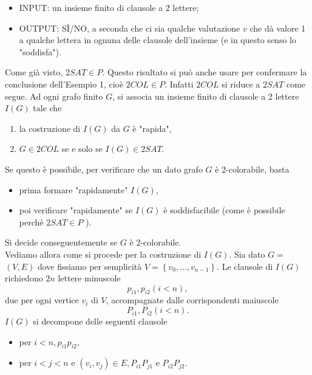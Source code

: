 \begin{enumerate}
          \begin{itemize}
              \item INPUT: un insieme finito di clausole a 2 lettere;
              \item OUTPUT: Sİ/NO, a seconda che ci sia qualche valutazione $v$
                    che dà valore 1 a qualche lettera in ognuna delle clausole
                    dell'insieme (e in questo senso lo "soddisfa").
          \end{itemize}

          Come già visto, $2 S A T \in P$. Questo risultato si può anche usare
          per confermare la conclusione dell'Esempio 1, cioè $2 C O L \in P$.
          Infatti $2 C O L$ si riduce a $2 S A T$ come segue. Ad ogni grafo
          finito $G$, si associa un insieme finito di clausole a 2 lettere
          $I(G)$ tale che

          \begin{enumerate}[label=(\roman*)]
              \item la costruzione di $I(G)$ da $G$ è "rapida",
              \item $G \in 2 C O L$ se e solo se $I(G) \in 2 S A T$.
          \end{enumerate}

          Se questo è possibile, per verificare che un dato grafo $G$ è
          2-colorabile, basta
          \begin{itemize}
              \item prima formare "rapidamente" $I(G)$,
              \item poi verificare "rapidamente" se $I(G)$ è soddisfacibile
                    (come è possibile perché $2 S A T \in P$ ).
          \end{itemize}

          Si decide conseguentemente se $G$ è 2-colorabile.\\
          Vediamo allora come
          si procede per la costruzione di $I(G)$. Sia dato $G=$ $(V, E)$ dove
          fissiamo per semplicità $V=\left\{v_0, \ldots, v_{n-1}\right\}$. Le
          clausole di $I(G)$ richiedono $2 n$ lettere minuscole
          $$
              p_{i 1}, p_{i 2}(i<n),
          $$
          due per ogni vertice $v_i$ di $V$, accompagnate dalle corrispondenti
          maiuscole
          $$
              P_{i 1}, P_{i 2}(i<n) .
          $$
          $I(G)$ si decompone delle seguenti clausole

          \begin{itemize}
              \item per $i<n, p_{i 1} p_{i 2}$,
              \item per $i<j<n$ e $\left(v_i, v_j\right) \in E, P_{i 1}
                        P_{j 1}$ e $P_{i 2} P_{j 2}$.
          \end{itemize}


\end{enumerate}
